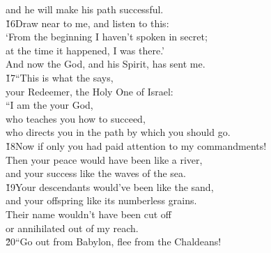 \begin{poetry}
\poemlll       and he will make his path successful. \\
\poeml \v{16}Draw near to me, and listen to this: \\
\poemll    `From the beginning I haven't spoken in secret; \\
\poeml at the time it happened, I was there.' \\
\poemll    And now the  God, and his Spirit, has sent me. \\
\poeml \v{17}``This is what the  says, \\
\poemll    your Redeemer, the Holy One of Israel: \\
\poeml ``I am the  your God, \\
\poemll    who teaches you how to succeed, \\
\poemlll       who directs you in the path by which you should go. \\
\poeml \v{18}Now if only you had paid attention to my commandments! \\
\poemll    Then your peace would have been like a river, \\
\poemlll       and your success like the waves of the sea. \\
\poeml \v{19}Your descendants would've been like the sand, \\
\poemll    and your offspring like its numberless grains. \\
\poeml Their name wouldn't have been cut off \\
\poemll    or annihilated out of my reach. \\
\poeml \v{20}``Go out from Babylon, flee from the Chaldeans! \\

\end{poetry}
